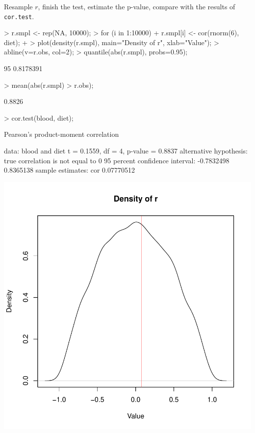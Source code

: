 \documentclass[a4paper]{article}
\theoremstyle{definition}
\begin{document}
\begin{Exercise}
Resample $r$, finish the test, estimate the p-value, compare with the
results of \texttt{cor.test}.
\end{Exercise}
\begin{Answer}
\begin{Schunk}
\begin{Sinput}
> r.smpl <- rep(NA, 10000);
> for (i in 1:10000) {
+   r.smpl[i] <- cor(rnorm(6), diet);
+ }
> plot(density(r.smpl), main="Density of r", xlab="Value");
> abline(v=r.obs, col=2);
> quantile(abs(r.smpl), probs=0.95);
\end{Sinput}
\begin{Soutput}
      95%
0.8178391 
\end{Soutput}
\begin{Sinput}
> mean(abs(r.smpl) > r.obs);
\end{Sinput}
\begin{Soutput}
[1] 0.8826
\end{Soutput}
\begin{Sinput}
> cor.test(blood, diet);
\end{Sinput}
\begin{Soutput}
	Pearson's product-moment correlation

data:  blood and diet 
t = 0.1559, df = 4, p-value = 0.8837
alternative hypothesis: true correlation is not equal to 0 
95 percent confidence interval:
 -0.7832498  0.8365138 
sample estimates:
       cor 
0.07770512 
\end{Soutput}
\end{Schunk}
\includegraphics{correlation-004}
\end{Answer}
\end{document}
